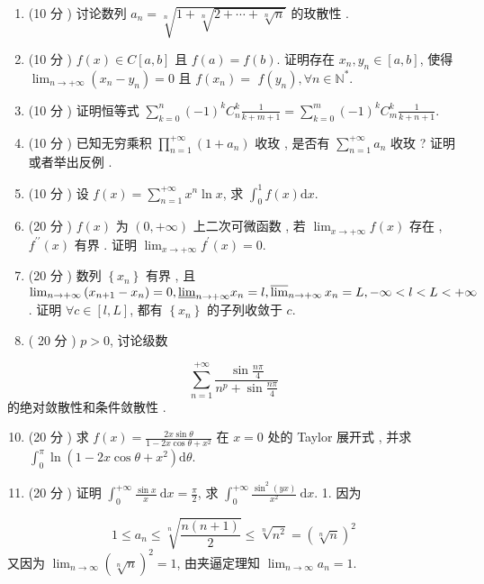 \documentclass[10pt]{article}
\begin{document}
\begin{enumerate}
  \item (10  分 )  讨论数列  $a_{n}=\sqrt[n]{1+\sqrt[n]{2+\cdots+\sqrt[n]{n}}}$  的玫散性 .

  \item (10  分 ) $f(x) \in C[a, b]$  且  $f(a)=f(b)$.  证明存在  $x_{n}, y_{n} \in[a, b]$,  使得  $\lim _{n \rightarrow+\infty}\left(x_{n}-y_{n}\right)=0$  且  $f\left(x_{n}\right)=$ $f\left(y_{n}\right), \forall n \in \mathbb{N}^{*}$.

  \item (10  分 )  证明恒等式  $\sum_{k=0}^{n}(-1)^{k} C_{n}^{k} \frac{1}{k+m+1}=\sum_{k=0}^{m}(-1)^{k} C_{m}^{k} \frac{1}{k+n+1}$.

  \item (10  分 )  已知无穷乘积  $\prod_{n=1}^{+\infty}\left(1+a_{n}\right)$  收玫 ,  是否有  $\sum_{n=1}^{+\infty} a_{n}$  收玫 ?  证明或者举出反例 .

  \item (10  分 )  设  $f(x)=\sum_{n=1}^{+\infty} x^{n} \ln x$,  求  $\int_{0}^{1} f(x) \mathrm{d} x$.

  \item (20  分 ) $f(x)$  为  $(0,+\infty)$  上二次可微函数 ,  若  $\lim _{x \rightarrow+\infty} f(x)$  存在 , $f^{\prime \prime}(x)$  有界 .  证明  $\lim _{x \rightarrow+\infty} f^{\prime}(x)=0$.

  \item (20  分 )  数列  $\left\{x_{n}\right\}$  有界 ,  且  $\lim _{n \rightarrow+\infty}\left(x_{n+1}-x_{n}\right)=0, \underline{\lim }_{n \rightarrow+\infty} x_{n}=l, \varlimsup_{n \rightarrow+\infty} x_{n}=L,-\infty<l<L<+\infty$.  证明  $\forall c \in[l, L]$,  都有  $\left\{x_{n}\right\}$  的子列收敛于  $c$.

  \item ( 20  分 ) $p>0$,  讨论级数 

\end{enumerate}
$$
\sum_{n=1}^{+\infty} \frac{\sin \frac{n \pi}{4}}{n^{p}+\sin \frac{n \pi}{4}}
$$
 的绝对敛散性和条件敛散性 .

\begin{enumerate}
  \setcounter{enumi}{9}
  \item (20  分 )  求  $f(x)=\frac{2 x \sin \theta}{1-2 x \cos \theta+x^{2}}$  在  $x=0$  处的  Taylor  展开式 ,  并求  $\int_{0}^{\pi} \ln \left(1-2 x \cos \theta+x^{2}\right) \mathrm{d} \theta$.

  \item (20  分 )  证明  $\int_{0}^{+\infty} \frac{\sin x}{x} \mathrm{~d} x=\frac{\pi}{2}$,  求  $\int_{0}^{+\infty} \frac{\sin ^{2}(y x)}{x^{2}} \mathrm{~d} x$. 1.  因为 

\end{enumerate}
$$
1 \leqslant a_{n} \leqslant \sqrt[n]{\frac{n(n+1)}{2}} \leqslant \sqrt[n]{n^{2}}=(\sqrt[n]{n})^{2}
$$
 又因为  $\lim _{n \rightarrow \infty}(\sqrt[n]{n})^{2}=1$,  由夹逼定理知  $\lim _{n \rightarrow \infty} a_{n}=1$.
\end{document}
